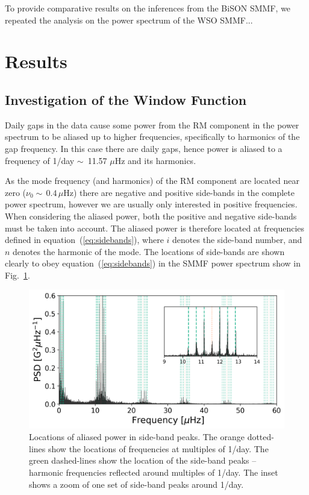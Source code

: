 To provide comparative results on the inferences from the BiSON SMMF, we repeated the analysis on the power spectrum of the WSO SMMF...


\section{Results}\label{sec:SMMF_reults}

\subsection{Investigation of the Window Function}\label{sec:window_fn}


Daily gaps in the data cause some power from the RM component in the power spectrum to be aliased up to higher frequencies, specifically to harmonics of the gap frequency. In this case there are daily gaps, hence power is aliased to a frequency of 1/day $\sim$~11.57 $\mu$Hz and its harmonics.

As the mode frequency (and harmonics) of the RM component are located near zero ($\nu_0 \sim \,0.4 \, \mu\mathrm{Hz}$) there are negative and positive side-bands in the complete power spectrum, however we are usually only interested in positive frequencies. When considering the aliased power, both the positive and negative side-bands must be taken into account. The aliased power is therefore located at frequencies defined in equation~(\ref{eq:sidebands}), where $i$ denotes the side-band number, and $n$ denotes the harmonic of the mode. The locations of side-bands are shown clearly to obey equation~(\ref{eq:sidebands}) in the SMMF power spectrum show in Fig.~\ref{fig:sideband_locations}.

\begin{figure}[ht!]
	\centering
	\includegraphics[width=\columnwidth]{sideband.png}
	\caption{Locations of aliased power in side-band peaks. The orange dotted-lines show the locations of frequencies at multiples of 1/day. The green dashed-lines show the location of the side-band peaks -- harmonic frequencies reflected around multiples of 1/day.  The inset shows a zoom of one set of side-band peaks around 1/day.}
	\label{fig:sideband_locations}
\end{figure}

